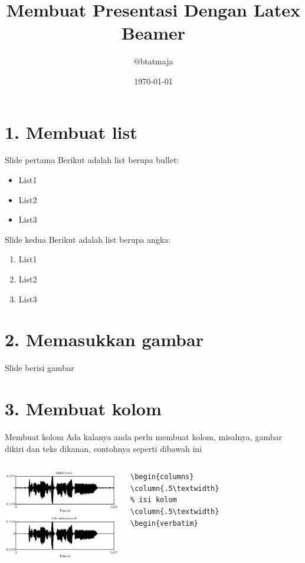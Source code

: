 \documentclass{beamer}
\title{Membuat Presentasi Dengan Latex Beamer}
\author{@btatmaja}
\date{\today}
\begin{document}
	\frame{\titlepage}
	
\section {1. Membuat list}
\begin{frame}[t, fragile]{Slide pertama}
Berikut adalah list berupa bullet:
\begin{itemize}
\item List1
\item List2
\item List3
\end{itemize}
\end{frame}


\begin{frame}[t, fragile]{Slide kedua}
Berikut adalah list berupa angka:
\begin{enumerate}
\item List1
\item List2
\item List3
\end{enumerate}
\end{frame}

\section{2. Memasukkan gambar}
\begin{frame}[t, fragile]{Slide berisi gambar}
\end{frame}

\section{3. Membuat kolom}
\begin{frame}[t, fragile] {Membuat kolom}
Ada kalanya anda perlu membuat kolom, misalnya, gambar dikiri dan teks dikanan, contohnya seperti dibawah ini \\
\begin{columns}
\includegraphics[width=2in]{pict/praat.eps}
\begin{verbatim}
\begin{columns}
\column{.5\textwidth}
% isi kolom
\column{.5\textwidth}
\begin{verbatim}
\end{verbatim}
\end{columns}
\end{frame}
\end{document}
